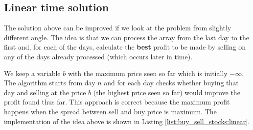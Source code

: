 \subsection{Linear time solution}
\label{buy_sell_stocks:sec:linear}
The solution above can be improved if we look at the problem from slightly different angle. The idea is that we can process the array from the last day to the first and, for each of the days, calculate the \textbf{best} profit to be made by selling on any of the days already processed (which occurs later in time).

We keep a variable $b$ with the maximum price seen so far which is initially $-\infty$. The algorithm starts from day $n$ and for each day checks whether buying that day and selling at the price $b$ (the highest price seen so far) would improve the profit found thus far. This approach is correct because the maximum profit happens when the spread between sell and buy price is maximum.
The implementation of the idea above is shown in Listing \ref{list:buy_sell_stocks:linear}.








